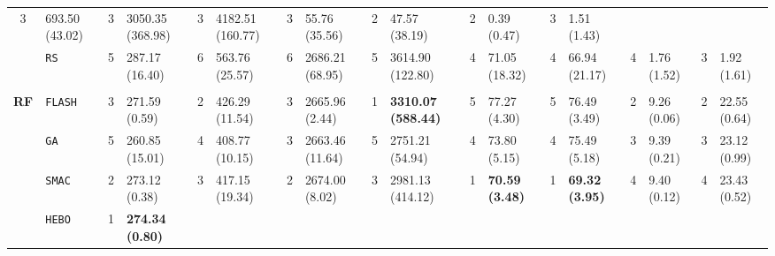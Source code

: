 \begin{tabular}{clllllllllllllllll}
  3 &
  \multicolumn{1}{l|}{693.50 (43.02)} &
  3 &
  \multicolumn{1}{l|}{3050.35 (368.98)} &
  3 &
  \multicolumn{1}{l|}{4182.51 (160.77)} &
  3 &
  \multicolumn{1}{l|}{55.76 (35.56)} &
  2 &
  \multicolumn{1}{l|}{47.57 (38.19)} &
  2 &
  \multicolumn{1}{l|}{0.39 (0.47)} &
  3 &
  1.51 (1.43) \\
\multicolumn{1}{c|}{} &
  \multicolumn{1}{l|}{\texttt{RS}} &
  5 &
  \multicolumn{1}{l|}{287.17 (16.40)} &
  6 &
  \multicolumn{1}{l|}{563.76 (25.57)} &
  6 &
  \multicolumn{1}{l|}{2686.21 (68.95)} &
  5 &
  \multicolumn{1}{l|}{3614.90 (122.80)} &
  4 &
  \multicolumn{1}{l|}{71.05 (18.32)} &
  4 &
  \multicolumn{1}{l|}{66.94 (21.17)} &
  4 &
  \multicolumn{1}{l|}{1.76 (1.52)} &
  3 &
  1.92 (1.61) \\
\hline
\multicolumn{1}{l}{\textbf{}} &
    &
    &
    &
    &
    &
    &
    &
    &
    &
    &
    &
    &
    &
    &
    &
    &
    \\ \hline
\multicolumn{1}{c|}{\multirow{7}{*}{\textbf{RF}}} &
  \multicolumn{1}{l|}{\texttt{FLASH}} &
  3 &
  \multicolumn{1}{l|}{271.59 (0.59)} &
  2 &
  \multicolumn{1}{l|}{426.29 (11.54)} &
  3 &
  \multicolumn{1}{l|}{2665.96 (2.44)} &
  \cellcolor{blue!15}1 &
  \multicolumn{1}{l|}{\cellcolor{blue!15}\textbf{3310.07 (588.44)}} &
  5 &
  \multicolumn{1}{l|}{77.27 (4.30)} &
  5 &
  \multicolumn{1}{l|}{76.49 (3.49)} &
  2 &
  \multicolumn{1}{l|}{9.26 (0.06)} &
  2 &
  22.55 (0.64) \\
\multicolumn{1}{c|}{} &
  \multicolumn{1}{l|}{\texttt{GA}} &
  5 &
  \multicolumn{1}{l|}{260.85 (15.01)} &
  4 &
  \multicolumn{1}{l|}{408.77 (10.15)} &
  3 &
  \multicolumn{1}{l|}{2663.46 (11.64)} &
  5 &
  \multicolumn{1}{l|}{2751.21 (54.94)} &
  4 &
  \multicolumn{1}{l|}{73.80 (5.15)} &
  4 &
  \multicolumn{1}{l|}{75.49 (5.18)} &
  3 &
  \multicolumn{1}{l|}{9.39 (0.21)} &
  3 &
  23.12 (0.99) \\
\multicolumn{1}{c|}{} &
  \multicolumn{1}{l|}{\texttt{SMAC}} &
  2 &
  \multicolumn{1}{l|}{273.12 (0.38)} &
  3 &
  \multicolumn{1}{l|}{417.15 (19.34)} &
  2 &
  \multicolumn{1}{l|}{2674.00 (8.02)} &
  3 &
  \multicolumn{1}{l|}{2981.13 (414.12)} &
  \cellcolor{blue!15}1 &
  \multicolumn{1}{l|}{\cellcolor{blue!15}\textbf{70.59 (3.48)}} &
  \cellcolor{blue!15}1 &
  \multicolumn{1}{l|}{\cellcolor{blue!15}\textbf{69.32 (3.95)}} &
  4 &
  \multicolumn{1}{l|}{9.40 (0.12)} &
  4 &
  23.43 (0.52) \\
\multicolumn{1}{c|}{} &
  \multicolumn{1}{l|}{\texttt{HEBO}} &
  \cellcolor{blue!15}1 &
  \multicolumn{1}{l|}{\cellcolor{blue!15}\textbf{274.34 (0.80)}} &

\end{tabular}
